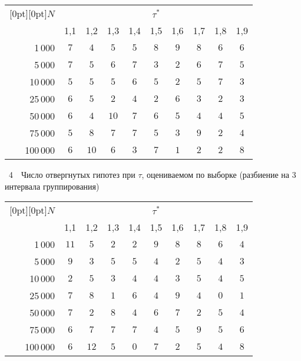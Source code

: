 \begin{multicols}{2}
\begin{center}
{\small 
\tabcolsep=4.4pt
\begin{tabular}{|r|c|c|c|c|c|c|c|c|c|}
\hline
\multicolumn{1}{|c|}{\raisebox{-6pt}[0pt][0pt]{$N$}} &\multicolumn{9}{c|}{$\tau^*$}\\
\cline{2-10}
& 1,1 & 1,2 & 1,3 & 1,4 & 1,5 & 1,6 & 1,7 & 1,8 & 1,9 \\ 
\hline
1\,000 & $7$ & $4$ & $5$ & $5$ & $8$ & $9$ & $8$ & $6$ & $6$ \\
5\,000 & $7$ & $5$ & $6$ & $7$ & $3$ & $2$ & $6$ & $7$ & $5$ \\
10\,000 & $5$ & $5$ & $5$ & $6$ & $5$ & $2$ & $5$ & $7$ & $3$ \\
25\,000 & $6$ & $5$ & $2$ & $4$ & $2$ & $6$ & $3$ & $2$ & $3$ \\
50\,000 & $6$ & $4$ & $10$\hphantom{9} & $7$ & $6$ & $5$ & $4$ & $4$ & $5$ \\
75\,000 & $5$ & $8$ & $7$ & $7$ & $5$ & $3$ & $9$ & $2$ & $4$ \\
100\,000 & $6$ & $10$\hphantom{9} & $6$ & $3$ & $7$ & $1$ & $2$ & $2$ & $8$ \\ \hline
\end{tabular}
}
\end{center}

\vspace*{6pt}

\noindent
{{\tablename~4}\ \ \small{Число отвергнутых гипотез при $\tau$, оцени\-ва\-емом
по выборке (разбиение на 3 интервала группирования)}}

\vspace*{6pt}

\begin{center}
{\small 
\tabcolsep=4.4pt
\begin{tabular}{|r|c|c|c|c|c|c|c|c|c|}
\hline
\multicolumn{1}{|c|}{\raisebox{-6pt}[0pt][0pt]{$N$}} &\multicolumn{9}{c|}{$\tau^*$}\\
\cline{2-10}
& 1,1 & 1,2 & 1,3 & 1,4 & 1,5 & 1,6 & 1,7 & 1,8 & 1,9 \\ 
\hline
1\,000 & $11$\hphantom{9} & $5$ & $2$ & $2$ & $9$ & $8$ & $8$ & $6$ & $4$ \\
5\,000 & $9$ & $3$ & $5$ & $5$ & $4$ & $2$ & $5$ & $4$ & $3$ \\
10\,000 & $2$ & $5$ & $3$ & $4$ & $4$ & $3$ & $5$ & $4$ & $5$ \\
25\,000 & $7$ & $8$ & $1$ & $6$ & $4$ & $9$ & $4$ & $0$ & $1$ \\
50\,000 & $7$ & $2$ & $8$ & $4$ & $6$ & $7$ & $2$ & $5$ & $4$ \\
75\,000 & $6$ & $7$ & $7$ & $7$ & $4$ & $5$ & $9$ & $5$ & $6$ \\
100\,000 & $6$ & $12$\hphantom{9} & $5$ & $0$ & $7$ & $2$ & $5$ & $4$ & $8$\\ 
\hline
\end{tabular}}
\end{center}




\end{multicols}
